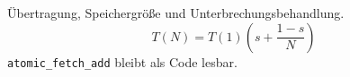 \documentclass[ngerman,11pt,a4paper]{article}
\begin{document}
\begin{tcolorbox}[title={Deutsches Vorlesungshandout},breakable]
Übertragung, Speichergröße und Unterbrechungsbehandlung.
\[
T(N)=T(1)\left(s+\frac{1-s}{N}\right)
\]
\texttt{atomic\_fetch\_add} bleibt als Code lesbar.
\end{tcolorbox}
\end{document}
